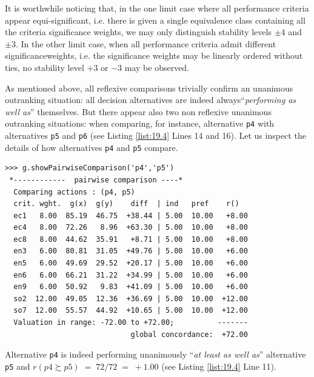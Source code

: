 It is worthwhile noticing that, in the one limit case where all performance criteria appear equi-significant, i.e. there is given a single equivalence class containing all the criteria significance weights, we may only distinguish stability levels $\pm 4$ and $\pm 3$. In the other limit case, when all performance criteria admit different significanceweights, i.e. the significance weights may be linearly ordered without ties, no stability level $+3$ or $-3$ may be observed.

As mentioned above, all reflexive comparisons trivially confirm an unanimous outranking situation: all decision alternatives are indeed always``\emph{performing as well as}'' themselves. But there appear also two non reflexive unanimous outranking situations: when comparing, for instance, alternative \texttt{p4} with alternatives \texttt{p5} and \texttt{p6} (see Listing \ref{list:19.4} Lines 14 and 16). Let us inspect the details of how alternatives \texttt{p4} and \texttt{p5} compare.
\begin{lstlisting}
>>> g.showPairwiseComparison('p4','p5')
 *------------  pairwise comparison ----*
  Comparing actions : (p4, p5)
  crit. wght.  g(x)  g(y)    diff  | ind   pref    r()
  ec1   8.00  85.19  46.75  +38.44 | 5.00  10.00   +8.00
  ec4   8.00  72.26   8.96  +63.30 | 5.00  10.00   +8.00
  ec8   8.00  44.62  35.91   +8.71 | 5.00  10.00   +8.00
  en3   6.00  80.81  31.05  +49.76 | 5.00  10.00   +6.00
  en5   6.00  49.69  29.52  +20.17 | 5.00  10.00   +6.00
  en6   6.00  66.21  31.22  +34.99 | 5.00  10.00   +6.00
  en9   6.00  50.92   9.83  +41.09 | 5.00  10.00   +6.00
  so2  12.00  49.05  12.36  +36.69 | 5.00  10.00  +12.00
  so7  12.00  55.57  44.92  +10.65 | 5.00  10.00  +12.00
  Valuation in range: -72.00 to +72.00;          -------
                             global concordance:  +72.00
\end{lstlisting}
Alternative \texttt{p4} is indeed performing unanimously ``\emph{at least as well as}'' alternative \texttt{p5} and $r(p4 \succsim p5)\; =\; 72/72\; =\; +1.00$ (see Listing \ref{list:19.4} Line 11).

